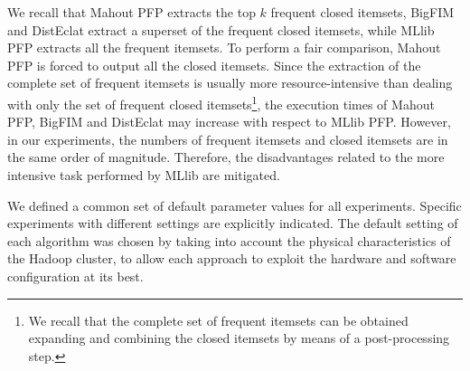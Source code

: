 \documentclass[preprint,review,12pt]{elsarticle}
\begin{document}
We recall that Mahout PFP extracts the top $k$ frequent closed itemsets, BigFIM
and DistEclat extract a superset of the frequent closed itemsets,
while MLlib PFP extracts all the frequent itemsets.
To perform a fair comparison, Mahout PFP is forced to output all the closed
itemsets.
Since the extraction of the complete set of frequent itemsets is usually
more resource-intensive than dealing with only the set of frequent closed
itemsets\footnote{We recall that the complete set of frequent itemsets can be
obtained expanding and combining the closed itemsets by means of a
post-processing step.},
the execution times of Mahout PFP, BigFIM and DistEclat may increase with respect
to MLlib PFP.
However, in our experiments, the numbers of frequent itemsets and closed itemsets are in the same order of magnitude.
Therefore, the disadvantages related to the more intensive task performed
by MLlib are mitigated.






We defined a common set of default parameter values for all experiments.
Specific experiments with different settings are explicitly indicated.
The default setting of each algorithm was chosen by taking into account
the physical characteristics of the Hadoop cluster,
to allow each approach to exploit the hardware and software configuration at its best.
\end{document}
